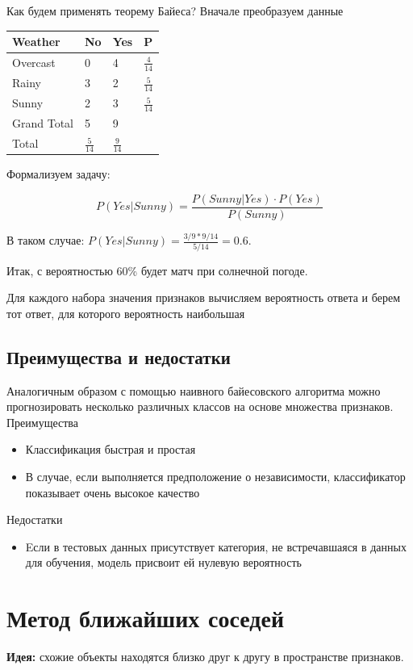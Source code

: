 \documentclass{article}
\begin{document}
Как будем применять теорему Байеса? Вначале преобразуем данные

\begin{tabular}{|l|l|l|l|} 
\hline Weather & No & Yes & P \\
\hline Overcast & 0 & 4 & $\frac{4}{14}$ \\
\hline Rainy & 3 & 2 & $\frac{5}{14}$ \\
\hline Sunny & 2 & 3 & $\frac{5}{14}$\\
\hline Grand Total & 5 & 9 \\
\hline Total & $\frac{5}{14}$ & $\frac{9}{14}$ \\
\hline
\end{tabular}

Формализуем задачу:

\begin{equation}
    P(Yes|Sunny) = \frac{P(Sunny|Yes) \cdot P(Yes)}{P(Sunny)}
\end{equation}

В таком случае: $P(Yes|Sunny) = \frac{3/9*9/14}{5/14} = 0.6$.

Итак, с вероятностью 60\% будет матч при солнечной погоде. 

Для каждого набора значения признаков вычисляем вероятность ответа и берем тот ответ, для которого вероятность наибольшая

\subsection{Преимущества и недостатки}
Аналогичным образом с помощью наивного байесовского алгоритма можно прогнозировать несколько различных классов на основе множества признаков.
Преимущества
\begin{itemize}
    \item Классификация быстрая и простая
    \item В случае, если выполняется предположение о независимости, классификатор показывает очень высокое качество
\end{itemize}

Недостатки
\begin{itemize}
    \item Eсли в тестовых данных присутствует категория, не встречавшаяся в данных для обучения, модель присвоит ей нулевую вероятность
\end{itemize}

\section{Метод ближайших соседей}
\textbf{Идея:} схожие объекты находятся близко друг к другу в пространстве признаков.
\end{document}

